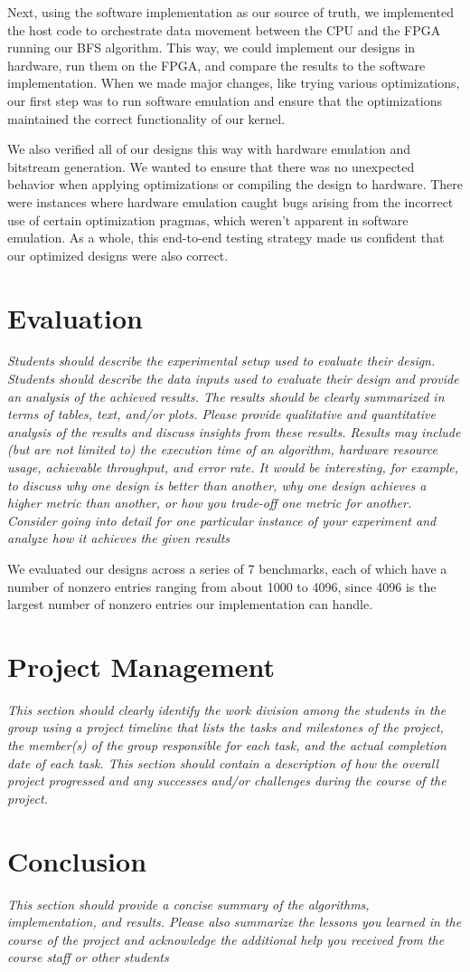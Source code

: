 \documentclass[10pt]{article}
\begin{document}
Next, using the software implementation as our source of truth, we implemented the host code to orchestrate
data movement between the CPU and the FPGA running our BFS algorithm. This way, we could implement our designs
in hardware, run them on the FPGA, and compare the results to the software implementation. When we made
major changes, like trying various optimizations, our first step was to run software emulation and ensure
that the optimizations maintained the correct functionality of our kernel.

We also verified all of our designs this way with hardware emulation and bitstream generation. We wanted
to ensure that there was no unexpected behavior when applying optimizations or compiling the design
to hardware. There were instances where hardware emulation caught bugs arising from the incorrect use
of certain optimization pragmas, which weren't apparent in software emulation. As a whole, this end-to-end
testing strategy made us confident that our optimized designs were also correct.

\section{Evaluation}
\textit{Students should describe the experimental setup used to evaluate their design. Students
should describe the data inputs used to evaluate their design and provide an analysis of the achieved
results. The results should be clearly summarized in terms of tables, text, and/or plots. Please provide
qualitative and quantitative analysis of the results and discuss insights from these results. Results may
include (but are not limited to) the execution time of an algorithm, hardware resource usage, achievable
throughput, and error rate. It would be interesting, for example, to discuss why one design is better
than another, why one design achieves a higher metric than another, or how you trade-off one metric
for another. Consider going into detail for one particular instance of your experiment and analyze how
it achieves the given results}

We evaluated our designs across a series of 7 benchmarks, each of which have a number of nonzero entries ranging
from about 1000 to 4096, since 4096 is the largest number of nonzero entries our implementation can handle.


\section{Project Management}
\textit{This section should clearly identify the work division among the students in
the group using a project timeline that lists the tasks and milestones of the project, the member(s) of
the group responsible for each task, and the actual completion date of each task. This section should
contain a description of how the overall project progressed and any successes and/or challenges during
the course of the project.}

\section{Conclusion}

\textit{This section should provide a concise summary of the algorithms, implementation, and results. Please also summarize the lessons you learned in the course of
the project and acknowledge the additional help you received from the course staff or other students}
\end{document}
